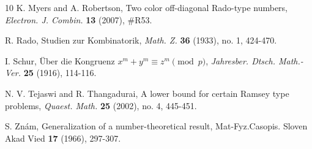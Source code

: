 \documentclass[11pt]{article}
\theoremstyle{definition}
\begin{document}
\begin{thebibliography}{10}
 K. Myers and A. Robertson, Two color off-diagonal Rado-type numbers, \textit{Electron. J. Combin.} \textbf{13} (2007), \#R53.

 R. Rado, Studien zur Kombinatorik, \textit{Math. Z.} \textbf{36} (1933), no. 1, 424-470.

 I. Schur, \"{U}ber die Kongruenz $x^m+y^m\equiv z^m\pmod p$, \textit{Jahresber. Dtsch. Math.-Ver.} \textbf{25} (1916), 114-116.

 N. V. Tejaswi and R. Thangadurai, A lower bound for certain Ramsey type problems, \textit{Quaest. Math.} \textbf{25} (2002), no. 4, 445-451.

 S. Zn\'{a}m, Generalization of a number-theoretical result, Mat-Fyz.Casopis. Sloven Akad Vied \textbf{17} (1966), 297-307.

\end{thebibliography}
\end{document}

